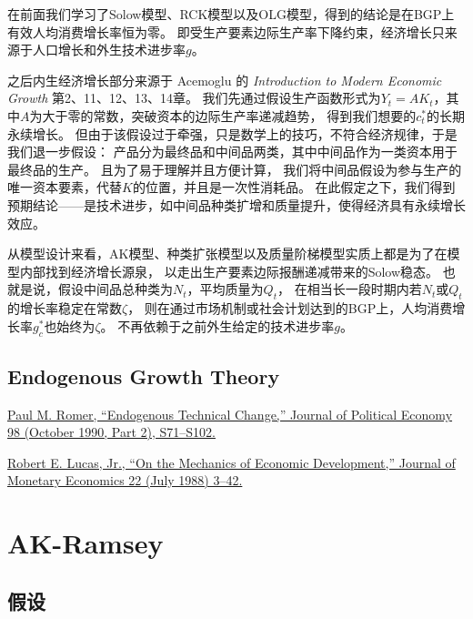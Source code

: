 \documentclass[cn,normal,11pt,black]{elegantnote}
\begin{document}
\begin{remark}
    在前面我们学习了Solow模型、RCK模型以及OLG模型，得到的结论是在BGP上有效人均消费增长率恒为零。
    即受生产要素边际生产率下降约束，经济增长只来源于人口增长和外生技术进步率$g$。
    
    之后内生经济增长部分来源于 Acemoglu 的 \textit{Introduction to Modern Economic Growth} 第2、11、12、13、14章。
    我们先通过假设生产函数形式为$Y_t = A K_t$，其中$A$为大于零的常数，突破资本的边际生产率递减趋势，
    得到我们想要的$c_t^*$的长期永续增长。
    但由于该假设过于牵强，只是数学上的技巧，不符合经济规律，于是我们退一步假设：
    产品分为最终品和中间品两类，其中中间品作为一类资本用于最终品的生产。
    且为了易于理解并且方便计算，
    我们将中间品假设为参与生产的唯一资本要素，代替$K$的位置，并且是一次性消耗品。
    在此假定之下，我们得到预期结论——是技术进步，如中间品种类扩增和质量提升，使得经济具有永续增长效应。
    
    从模型设计来看，AK模型、种类扩张模型以及质量阶梯模型实质上都是为了在模型内部找到经济增长源泉，
    以走出生产要素边际报酬递减带来的Solow稳态。
    也就是说，假设中间品总种类为$N_t$，平均质量为$Q_t$，
    在相当长一段时期内若$N_t$或$Q_t$的增长率稳定在常数$\zeta$，
    则在通过市场机制或社会计划达到的BGP上，人均消费增长率$g_c^*$也始终为$\zeta$。
    不再依赖于之前外生给定的技术进步率$g$。
\end{remark}

\subsection*{Endogenous Growth Theory}


\href{http://www.jstor.org/stable/2937632}
{Paul M. Romer, “Endogenous Technical Change,” Journal of Political Economy 98
(October 1990, Part 2), S71–S102.}

\href{http://dx.doi.org/10.1016/0304-3932(88)90168-7}
{Robert E. Lucas, Jr., “On the Mechanics of Economic Development,” Journal of
Monetary Economics 22 (July 1988) 3–42.}


\section{AK-Ramsey}
    
\subsection{假设}
\end{document}
